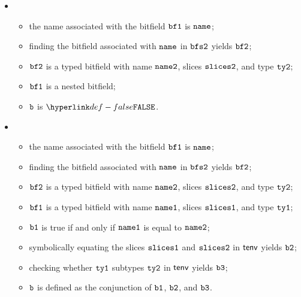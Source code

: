 \begin{itemize}
  \item {}
  \begin{itemize}
    \item the name associated with the bitfield $\texttt{bf1}$ is $\texttt{name}$;
    \item finding the bitfield associated with $\texttt{name}$ in $\texttt{bfs2}$ yields $\texttt{bf2}$;
    \item $\texttt{bf2}$ is a typed bitfield with name $\texttt{name2}$, slices $\texttt{slices2}$, and type $\texttt{ty2}$;
    \item $\texttt{bf1}$ is a nested bitfield;
    \item $\texttt{b}$ is $\False$.
  \end{itemize}

  \item {}
  \begin{itemize}
    \item the name associated with the bitfield $\texttt{bf1}$ is $\texttt{name}$;
    \item finding the bitfield associated with $\texttt{name}$ in $\texttt{bfs2}$ yields $\texttt{bf2}$;
    \item $\texttt{bf2}$ is a typed bitfield with name $\texttt{name2}$, slices $\texttt{slices2}$, and type $\texttt{ty2}$;
    \item $\texttt{bf1}$ is a typed bitfield with name $\texttt{name1}$, slices $\texttt{slices1}$, and type $\texttt{ty1}$;
    \item $\texttt{b1}$ is true if and only if $\texttt{name1}$ is equal to $\texttt{name2}$;
    \item symbolically equating the slices $\texttt{slices1}$ and $\texttt{slices2}$ in $\textsf{tenv}$ yields $\texttt{b2}$;
    \item checking whether $\texttt{ty1}$ subtypes $\texttt{ty2}$ in $\textsf{tenv}$ yields $\texttt{b3}$;
    \item $\texttt{b}$ is defined as the conjunction of $\texttt{b1}$, $\texttt{b2}$, and $\texttt{b3}$.
  \end{itemize}
\end{itemize}

\FormallyParagraph
{}

